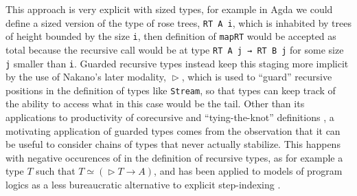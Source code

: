 \documentclass{book}
\DeclareMathOperator{\Later}{\vartriangleright}
\begin{document}
This approach is very explicit with sized types, for example in Agda
we could define a sized version of the type of rose trees,
\verb|RT A i|, which is inhabited by trees of height bounded by
the size \verb|i|, then definition of \verb|mapRT| would be accepted
as total because the recursive call would be at type
\verb|RT A j → RT B j| for some size \verb|j| smaller than \verb|i|. Guarded
recursive types instead keep this staging more implicit by the use of
Nakano's later modality, $\Later$, which is used to ``guard''
recursive positions in the definition of types like \verb|Stream|, so
that types can keep track of the ability to access what in this case
would be the tail.  Other than its applications to productivity of
corecursive and ``tying-the-knot'' definitions \cite{atkeyMcbride:icfp13},
a motivating application of guarded types comes from the
observation that it can be useful to consider chains of types that
never actually stabilize.  This happens with negative occurences of in
the definition of recursive types, as for example a type $T$ such that
$T \simeq (\Later T \to A)$, and has been applied to models of program
logics as a less bureaucratic alternative to explicit step-indexing
\cite{trees:lmcs12}.



\end{document}
